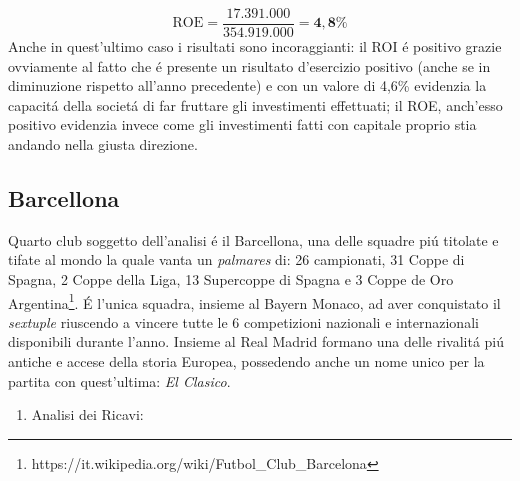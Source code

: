 \documentclass[
    corpo=12pt,
    oneside,
    evenboxes,
    tipotesi=triennale,
    stile=classica,
    oldstyle,
    autoretitolo,
    greek,
]{toptesi}
\begin{document}
\begin{interlinea}{1.5}
\begin{enumerate}
\begin{equation}
        \end{equation}
        \begin{equation}
            \text{ROE} = \frac{17.391.000}{354.919.000} = \mathbf{4,8\%}
        \label{eqn: roe_dor}
        \end{equation}
        Anche in quest'ultimo caso i risultati sono incoraggianti: il ROI \'e positivo grazie ovviamente al fatto che \'e presente un 
        risultato d'esercizio positivo (anche se in diminuzione rispetto all'anno precedente) e con un valore di 4,6\% evidenzia la capacit\'a
        della societ\'a di far fruttare gli investimenti effettuati; il ROE, anch'esso positivo evidenzia invece come gli investimenti fatti con 
        capitale proprio stia andando nella giusta direzione.
\end{enumerate}
\subsection{Barcellona}
Quarto club soggetto dell'analisi \'e il Barcellona, una delle squadre pi\'u titolate e tifate al mondo la quale vanta un \emph{palmares} di:
26 campionati, 31 Coppe di Spagna, 2 Coppe della Liga, 13 Supercoppe di Spagna e 3 Coppe de Oro Argentina\footnote{https://it.wikipedia.org/wiki/Futbol\_Club\_Barcelona}.
\'E l'unica squadra, insieme al Bayern Monaco, ad aver conquistato il \emph{sextuple} riuscendo a vincere tutte le 6 competizioni nazionali e
internazionali disponibili durante l'anno. Insieme al Real Madrid formano una delle rivalit\'a pi\'u antiche e accese della storia Europea, 
possedendo anche un nome unico per la partita con quest'ultima: \emph{El Clasico}.\newpage
\begin{enumerate}
    \item Analisi dei Ricavi:\newline
        \begin{figure}
            \centering

\end{figure}
\end{enumerate}
\end{interlinea}
\end{document}
